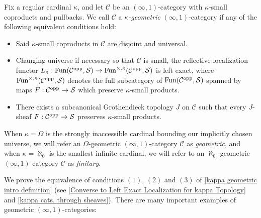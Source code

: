 \documentclass[10pt]{article}
\newcommand{\mS}{\mathcal S}
\newcommand{\C}{\mathcal C}
\theoremstyle{witharg}
\theoremstyle{witharg}
\theoremstyle{witharg2}
\begin{document}
\begin{definition}{}\label{kappa geometric intro definition}

    Fix a regular cardinal $\kappa$, and let $\C$ be an $(\infty,1)$-category with $\kappa$-small coproducts and pullbacks. We call $\C$ a \emph{$\kappa$-geometric} $(\infty,1)$-category if any of the following equivalent conditions hold:

    \begin{itemize}

        \item [$(1)$] Said $\kappa$-small coproducts in $\C$ are disjoint and universal. 

        \item [$(2)$] Changing universe if necessary so that $\C$ is small, the reflective localization functor $L_\kappa:\textnormal{Fun}(\C^{\textnormal{opp}},\mS)\rightarrow \textnormal{Fun}^{\times,\kappa}(\C^{\textnormal{opp}},\mS)$ is left exact, where $\textnormal{Fun}^{\times,\kappa}(\C^{\textnormal{opp}},\mS)$ denotes the full subcategory of $\textnormal{Fun}(\C^{\textnormal{opp}},\mS)$ spanned by maps $F:\C^{\textnormal{opp}}\rightarrow \mS$ which preserve $\kappa$-small products. 

        \item [$(3)$] There exists a subcanonical Grothendieck topology $J$ on $\C$ such that every $J$-sheaf $F:\C^{\textnormal{opp}}\rightarrow \mS$ preserves $\kappa$-small products. 

    \end{itemize}

    \noindent When $\kappa=\Omega$ is the strongly inaccessible cardinal bounding our implicitly chosen universe, we will refer an $\Omega$-geometric $(\infty,1)$-category $\C$ as \emph{geometric}, and when $\kappa=\aleph_0$ is the smallest infinite cardinal, we will refer to an $\aleph_0$-geometric $(\infty,1)$-category $\C$ as \emph{finitary}. 
    
\end{definition}

\noindent We prove the equivalence of conditions $(1)$, $(2)$ and $(3)$ of \ref{kappa geometric intro definition} (see \ref{Converse to Left Exact Localization for kappa Topology} and \ref{kappa cats. through sheaves}). There are many important examples of geometric $(\infty,1)$-categories:
\end{document}

